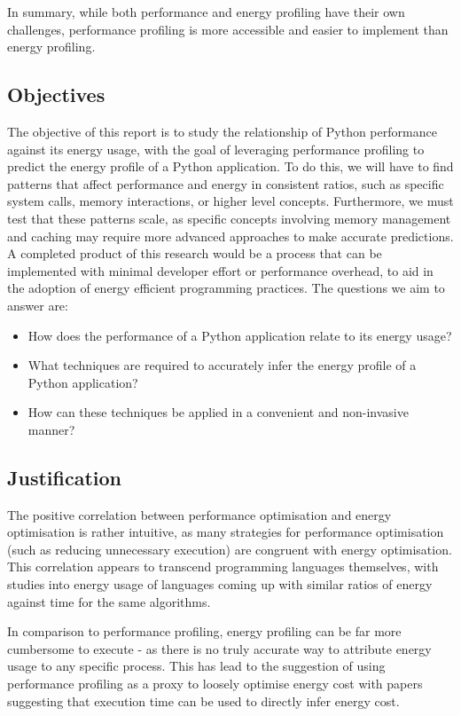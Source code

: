 In summary, while both performance and energy profiling have their own challenges, performance profiling is more
accessible and easier to implement than energy profiling.

\subsection{Objectives}\label{subsec:objectives}
The objective of this report is to study the relationship of Python performance against its energy usage, with the goal
of leveraging performance profiling to predict the energy profile of a Python application.
To do this, we will have to find patterns that affect performance and energy in consistent ratios, such as specific
system calls, memory interactions, or higher level concepts.
Furthermore, we must test that these patterns scale, as specific concepts involving memory management and caching may
require more advanced approaches to make accurate predictions.
A completed product of this research would be a process that can be implemented with minimal developer effort or
performance overhead, to aid in the adoption of energy efficient programming practices.
The questions we aim to answer are:

\begin{itemize}
 \item How does the performance of a Python application relate to its energy usage?
 \item What techniques are required to accurately infer the energy profile of a Python application?
 \item How can these techniques be applied in a convenient and non-invasive manner?
\end{itemize}

\subsection{Justification}\label{subsec:justification}
The positive correlation between performance optimisation and energy optimisation is rather intuitive, as many
strategies for performance optimisation (such as reducing unnecessary execution) are congruent with energy optimisation.
This correlation appears to transcend programming languages themselves, with studies into energy usage of languages
coming up with similar ratios of energy against time for the same algorithms\cite{EnergyEfficiencyAcrossProgrammingLanguages}.

In comparison to performance profiling, energy profiling can be far more cumbersome to execute - as there is no truly
accurate way to attribute energy usage to any specific process.
This has lead to the suggestion of using performance profiling as a proxy to loosely optimise energy
cost\cite{PerformanceVEnergyMobile} with papers suggesting that execution time can be used to directly infer energy
cost\cite{ExecutionTimeVsEnergyCost}.
